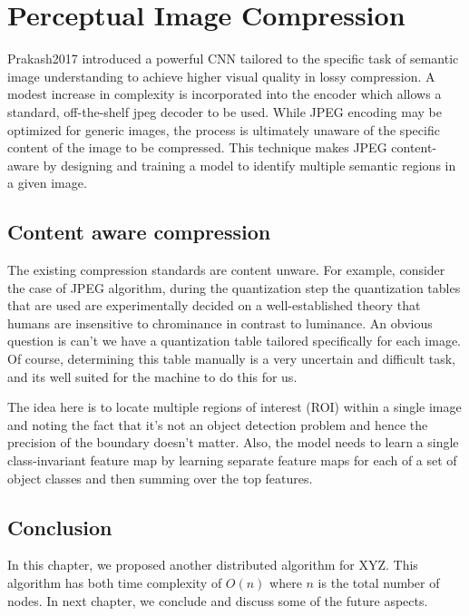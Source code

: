 \chapter{Perceptual Image Compression}

Prakash2017 \cite{Prakash2017} introduced a powerful CNN
tailored to the specific task of semantic image understanding to achieve higher visual quality in lossy compression. A modest increase in complexity is incorporated into the encoder which allows a standard, off-the-shelf jpeg decoder to be used. While JPEG encoding may be optimized for generic images, the process is ultimately unaware of the specific content of the image to be compressed. This technique makes JPEG content-aware by designing and training a model to identify multiple semantic regions in a given image.


\section{Content aware compression}

The existing compression standards are content unware. For example, consider the case of JPEG algorithm, during the quantization step the quantization tables that are used are experimentally decided on a well-established theory that humans are insensitive to chrominance in contrast to luminance. An obvious question is can't we have a quantization table tailored specifically for each image. Of course, determining this table manually is a very uncertain and difficult task, and its well suited for the machine to do this for us.

The idea here is to locate multiple regions of interest (ROI) within a single image and noting the fact that it's not an object detection problem and hence the precision of the boundary doesn't matter. Also, the model needs to learn a single class-invariant feature map by learning separate feature maps for each of a set of object classes and then summing over the top features.

\section{Conclusion}
In this chapter, we proposed another distributed algorithm for
XYZ. This algorithm has both time complexity of $O(n)$ where $n$
is the total number of nodes.  In next chapter, we conclude and
discuss some of the future aspects.

